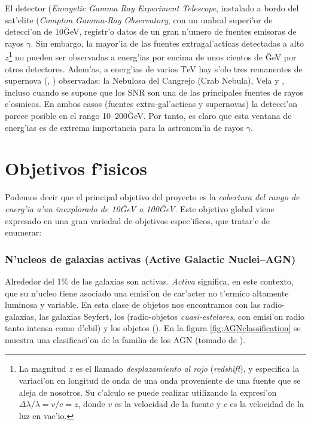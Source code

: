 El detector  (\emph{Energetic Gamma Ray Experiment
  Telescope}, instalado a bordo del sat'elite  (\emph{Compton
  Gamma-Ray Observatory}, con un umbral superi'or de detecci'on de
10\u{GeV}, registr'o datos de un gran n'umero de fuentes emisoras de
rayos $\gamma$. Sin embargo, la mayor'ia de las fuentes
extragal'acticas detectadas a alto %
%
$z$\footnote{La magnitud $z$ es el llamado \emph{desplazamiento al
    rojo} (\emph{redshift}), y especifica la variaci'on en longitud de
  onda de una onda proveniente de una fuente que se aleja de nosotros.
  Su c'alculo se puede realizar utilizando la expresi'on
  $\Delta\lambda/\lambda=v/c=z$, donde $v$ es la velocidad de la
  fuente y $c$ es la velocidad de la
luz en vac'io.}%
%
no pueden ser observadas a energ'ias por encima de unos cientos de
\u{GeV} por otros detectores. Adem'as, a energ'ias de varios \u{TeV}
hay s'olo tres remanentes de supernova (\emph{}, ) observadas: la Nebulosa del Cangrejo
(Crab Nebula), Vela y \I{SN\,1006}, incluso cuando se supone que los
SNR son una de las principales fuentes de rayos c'osmicos. En ambos
casos (fuentes extra-gal'acticas y supernovas) la detecci'on parece
posible en el rango 10--200\u{GeV}. Por tanto, es claro que esta
ventana de energ'ias es de extrema importancia para la astronom'ia de
rayos $\gamma$.

\CGROenergiesfig

\section{Objetivos f'isicos}
%
Podemos decir que el principal objetivo del proyecto \MAGIC es la
\emph{cobertura del rango de energ'ia a'un inexplorado de 10\u{GeV} a
  100\u{GeV}}. Este objetivo global viene expresado en una gran
variedad de objetivos espec'ificos, que tratar'e de enumerar:

\subsubsection*{N'ucleos de galaxias activas (Active Galactic 
Nuclei--AGN)}
%
Alrededor del 1\% de las galaxias son activas. \emph{Activa} significa,
en este contexto, que su n'ucleo tiene asociado una emisi'on de
car'acter no t'ermico altamente luminosa y variable.  En esta clase de
objetos nos encontramos con las radio-galaxias, las galaxias Seyfert,
los \emph{\I{cuasares}} (radio-objetos \emph{cuasi-estelares}, con
emisi'on radio tanto intensa como d'ebil) y los objetos
\emph{} (). En la figura
\ref{fig:AGNclassification} se muestra una clasificaci'on de la
familia de los AGN (tomado de \cite{Petry:tesis}).

